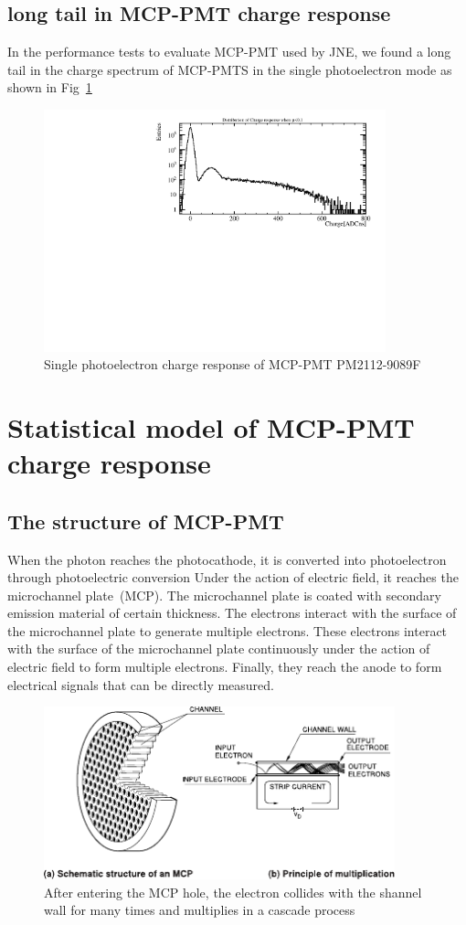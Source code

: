 \documentclass{article}
\begin{document}
\subsection{long tail in MCP-PMT charge response}\label{subsec:tail}
In the performance tests to evaluate MCP-PMT used by JNE, we found a long tail in the charge spectrum of MCP-PMTS in the single photoelectron mode as shown in Fig~\ref{fig:tail}
\begin{figure}[ht]
    \centering
    \includegraphics[height=7cm]{pic/longtail.pdf}
    \caption{Single photoelectron charge response of MCP-PMT PM2112-9089F}\label{fig:tail}
\end{figure}
\section{Statistical model of MCP-PMT charge response}
\subsection{The structure of MCP-PMT}\label{subsec:structure}
When the photon reaches the photocathode, it is converted into photoelectron through photoelectric conversion
Under the action of electric field, it reaches the microchannel plate~(MCP). The microchannel plate is coated with secondary emission material of certain thickness.
The electrons interact with the surface of the microchannel plate to generate multiple electrons. 
These electrons interact with the surface of the microchannel plate continuously under the action of electric field to form multiple electrons.
Finally, they reach the anode to form electrical signals that can be directly measured.
\begin{figure}[ht]
    \centering
    \includegraphics[height=5cm]{pic/structure.pdf}
    \caption{After entering the MCP hole, the electron collides with the shannel wall for many times and multiplies in a cascade process}\label{fig:structure}
\end{figure}
\end{document}
